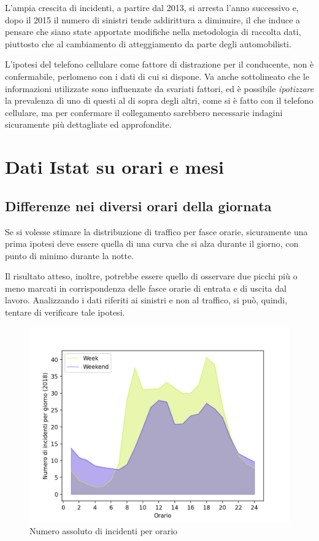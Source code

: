 \documentclass[a4paper]{report}
\newcommand{\quotestyle}[1]{\textit{#1}}
\begin{document}
L'ampia crescita di incidenti, a partire dal 2013, si arresta l'anno successivo e, 
dopo il 2015 il numero di sinistri tende addirittura a diminuire, 
il che induce a pensare che siano state apportate modifiche nella metodologia 
di raccolta dati, piuttosto che al cambiamento di atteggiamento da parte degli automobilisti.

L'ipotesi del telefono cellulare come fattore di distrazione per il conducente, 
non è confermabile, perlomeno con i dati di cui si dispone. 
Va anche sottolineato che le informazioni utilizzate sono influenzate da svariati fattori, ed è 
possibile \quotestyle{ipotizzare} la prevalenza di uno di questi al di sopra degli altri, 
come si è fatto con il telefono cellulare, 
ma per confermare il collegamento sarebbero necessarie indagini sicuramente 
più dettagliate ed approfondite.


\section{Dati Istat su orari e mesi}


\subsection{Differenze nei diversi orari della giornata}

Se si volesse stimare la distribuzione di traffico per fasce orarie, 
sicuramente una prima ipotesi 
deve essere quella di una curva che si alza durante il giorno, con 
punto di minimo durante la notte. 

Il risultato atteso, inoltre, potrebbe essere 
quello di osservare due picchi più o meno marcati 
in corrispondenza delle fasce orarie di entrata e di uscita dal lavoro. 
Analizzando i dati riferiti ai sinistri e non al traffico, si può, 
quindi, tentare di verificare tale ipotesi.

\begin{figure}
    \includegraphics[width=\linewidth]{../src/incidenti/incidenti_senza_coords/ore_punta/week_weekend.png}
    \caption{Numero assoluto di incidenti per orario}
    \label{fig:week-weekend}
\end{figure}
\end{document}
